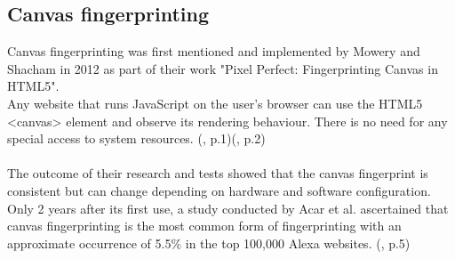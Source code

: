 \subsection{Canvas fingerprinting} \label{canvasfp}
Canvas fingerprinting was first mentioned and implemented by Mowery and Shacham in 2012 as part of their work "Pixel Perfect: Fingerprinting Canvas in HTML5".\\ Any website that runs JavaScript on the user's browser can use the HTML5 <canvas> element and observe its rendering behaviour. There is no need for any special access to system resources. (\textcite{mowery12}, p.1)(\textcite{upi15}, p.2)\\\\
The outcome of their research and tests showed that the canvas fingerprint is consistent but can change depending on hardware and software configuration. Only 2 years after its first use, a study conducted by Acar et al. ascertained that canvas fingerprinting is the most common form of fingerprinting with an approximate occurrence of 5.5\% in the top 100,000 Alexa websites. (\textcite{acar14}, p.5)

